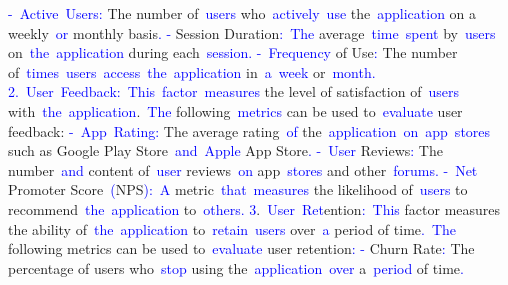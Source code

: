 \documentclass{article}
\begin{document}
\begin{tcolorbox}[colframe=black,colback=white]
{}\textcolor{blue}{-}\textcolor{blue}{~Active}\textcolor{blue}{~Users}\textcolor{blue}{:} The number of\textcolor{blue}{~users} who\textcolor{blue}{~actively}\textcolor{blue}{~use} the\textcolor{blue}{~application} on a weekly\textcolor{blue}{~or} monthly basis\textcolor{blue}{.
}\textcolor{blue}{-} Session Duration\textcolor{blue}{:}\textcolor{blue}{~The} average\textcolor{blue}{~time}\textcolor{blue}{~spent} by\textcolor{blue}{~users} on\textcolor{blue}{~the}\textcolor{blue}{~application} during each\textcolor{blue}{~session}\textcolor{blue}{.
}\textcolor{blue}{-}\textcolor{blue}{~Frequency} of Use\textcolor{blue}{:} The number of\textcolor{blue}{~times}\textcolor{blue}{~users}\textcolor{blue}{~access}\textcolor{blue}{~the}\textcolor{blue}{~application} in\textcolor{blue}{~a}\textcolor{blue}{~week} or\textcolor{blue}{~month}\textcolor{blue}{.
}\textcolor{blue}{2}\textcolor{blue}{.}\textcolor{blue}{~User}\textcolor{blue}{~Feedback}\textcolor{blue}{:}\textcolor{blue}{~This}\textcolor{blue}{~factor}\textcolor{blue}{~measures} the level of satisfaction of\textcolor{blue}{~users} with\textcolor{blue}{~the}\textcolor{blue}{~application}.\textcolor{blue}{~The} following\textcolor{blue}{~metrics} can be used to\textcolor{blue}{~evaluate} user feedback:
\textcolor{blue}{-}\textcolor{blue}{~App}\textcolor{blue}{~Rating}\textcolor{blue}{:} The average rating\textcolor{blue}{~of} the\textcolor{blue}{~application}\textcolor{blue}{~on}\textcolor{blue}{~app}\textcolor{blue}{~stores} such as Google Play Store\textcolor{blue}{~and}\textcolor{blue}{~Apple} App Store\textcolor{blue}{.
}\textcolor{blue}{-}\textcolor{blue}{~User} Reviews\textcolor{blue}{:} The number\textcolor{blue}{~and} content of\textcolor{blue}{~user} reviews\textcolor{blue}{~on} app\textcolor{blue}{~stores} and other\textcolor{blue}{~forums}\textcolor{blue}{.
}\textcolor{blue}{-}\textcolor{blue}{~Net} Promoter Score\textcolor{blue}{~(}NPS\textcolor{blue}{):}\textcolor{blue}{~A} metric\textcolor{blue}{~that}\textcolor{blue}{~measures} the likelihood of\textcolor{blue}{~users} to recommend\textcolor{blue}{~the}\textcolor{blue}{~application} to\textcolor{blue}{~others}\textcolor{blue}{.
}\textcolor{blue}{3}.\textcolor{blue}{~User}\textcolor{blue}{~Ret}ention\textcolor{blue}{:}\textcolor{blue}{~This} factor measures the ability of\textcolor{blue}{~the}\textcolor{blue}{~application} to\textcolor{blue}{~retain}\textcolor{blue}{~users} over\textcolor{blue}{~a} period of time\textcolor{blue}{.}\textcolor{blue}{~The} following metrics can be used to\textcolor{blue}{~evaluate} user retention\textcolor{blue}{:
}\textcolor{blue}{-} Churn Rate\textcolor{blue}{:} The percentage of users who\textcolor{blue}{~stop} using the\textcolor{blue}{~application}\textcolor{blue}{~over} a\textcolor{blue}{~period} of time\textcolor{blue}{.
}
\end{tcolorbox}
\end{document}
